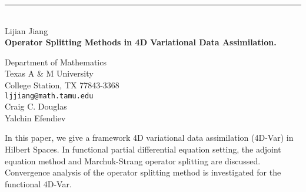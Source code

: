 \documentclass{report}
\begin{document}
\begin{center}
\rule{6in}{1pt} \
{\large 
\\ Lijian Jiang \\
{\bf Operator Splitting Methods in 4D Variational Data Assimilation. 
}}

Department of Mathematics \\
Texas A & M University \\ 
College Station, TX 77843-3368 \\
{\tt ljjiang@math.tamu.edu}\\
Craig C. Douglas \\ %
Yalchin Efendiev %
\end{center}

In this paper, we give a framework 4D variational data assimilation (4D-Var) in Hilbert Spaces. In functional partial diﬀerential equation setting, the adjoint equation method and Marchuk-Strang operator splitting are discussed. Convergence analysis of the operator splitting method is investigated for the functional 4D-Var. 
\end{document}
